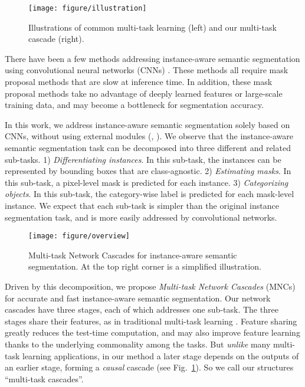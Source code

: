 \documentclass[10pt,twocolumn,letterpaper]{article}
\begin{document}
\begin{figure}[t]
\centering
\texttt{[image: figure/illustration]}
\caption{Illustrations of common multi-task learning (left) and our multi-task cascade (right).}
\label{fig:illustration}
\vspace{-1em}
\end{figure}

There have been a few methods \cite{Girshick2014,Hariharan2014,Dai2015,Hariharan2015} addressing instance-aware semantic segmentation using convolutional neural networks (CNNs) \cite{LeCun1989,Krizhevsky2012}.
These methods all require mask proposal methods \cite{Uijlings2013,Carreira2012a,Arbelaez2014} that are slow at inference time. In addition, these mask proposal methods take no advantage of deeply learned features or large-scale training data, and may become a bottleneck for segmentation accuracy.

In this work, we address instance-aware semantic segmentation solely based on CNNs, without using external modules (\eg, \cite{Arbelaez2014}).
We observe that the instance-aware semantic segmentation task can be decomposed into three different and related sub-tasks. 1) \emph{Differentiating instances}. In this sub-task, the instances can be represented by bounding boxes that are class-agnostic.
2) \emph{Estimating masks}. In this sub-task, a pixel-level mask is predicted for each instance. 3) \emph{Categorizing objects}. In this sub-task, the category-wise label is predicted for each mask-level instance. We expect that each sub-task is simpler than the original instance segmentation task, and is more easily addressed by convolutional networks.

\begin{figure*}[t]
\centering
\texttt{[image: figure/overview]}
\caption{Multi-task Network Cascades for instance-aware semantic segmentation. At the top right corner is a simplified illustration.}
\label{fig:overview}
\end{figure*}

Driven by this decomposition, we propose \emph{Multi-task Network Cascades} (MNCs) for accurate and fast instance-aware semantic segmentation. Our network cascades have three stages, each of which addresses one sub-task.
The three stages share their features, as in traditional multi-task learning \cite{Caruana1997}. Feature sharing greatly reduces the test-time computation, and may also improve feature learning thanks to the underlying commonality among the tasks. But \emph{unlike} many multi-task learning applications, in our method a later stage depends on the outputs of an earlier stage, forming a \emph{causal} cascade (see Fig.~\ref{fig:illustration}). So we call our structures ``multi-task cascades''.
\end{document}
